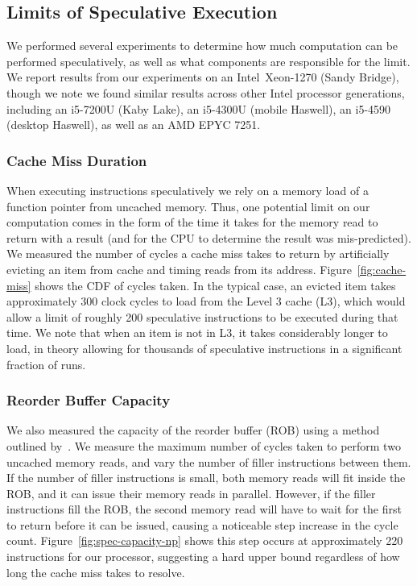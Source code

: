 \subsection{Limits of Speculative Execution}

\FigCacheMiss

\FigSpecMeasureNP

We performed several experiments to determine how much computation can be
performed
speculatively, as well as what components are responsible for the limit.
We report results from our experiments on an Intel~Xeon-1270 (Sandy Bridge),
though we note we found similar results across other Intel processor generations,
including an i5-7200U (Kaby Lake), %
an i5-4300U (mobile Haswell), %
an i5-4590 (desktop Haswell), %
as well as an AMD EPYC 7251. %



\subsubsection{Cache Miss Duration}
When executing instructions speculatively we rely on a memory load of a function
pointer from uncached memory. Thus, one potential limit on our computation comes
in the form of the time it takes for the memory read to return with a result
(and for the CPU to determine the result was mis-predicted).
We measured the number of cycles a
cache miss takes to return by artificially evicting an item from cache and
timing reads from its address.
Figure~\ref{fig:cache-miss} shows the CDF of cycles taken. In the typical case,
an evicted item takes approximately 300 clock cycles to load from the Level 3 cache (L3), which
would allow a limit of roughly 200 speculative instructions to be
executed during that time. We note that when an item is not in L3, it takes
considerably longer to load, in theory allowing for thousands of speculative
instructions in a significant fraction of runs.


\subsubsection{Reorder Buffer Capacity} \label{sssec:ROB}
We also measured the capacity of the reorder buffer (ROB) using a method
outlined by~\cite{measuring-rob}. We measure the maximum number of cycles taken
to perform two uncached memory reads, and vary the number of filler instructions
between them. If the number of filler instructions is small, both memory reads
will fit inside the ROB, and it can issue their memory reads in parallel.
However, if the filler instructions fill the ROB, the second memory read will
have to wait for the first to return before it can be issued, causing a
noticeable step increase in the cycle count. Figure~\ref{fig:spec-capacity-np}
shows this step occurs at approximately 220 instructions for our processor,
suggesting a hard upper bound regardless of how long the cache miss takes to
resolve.

